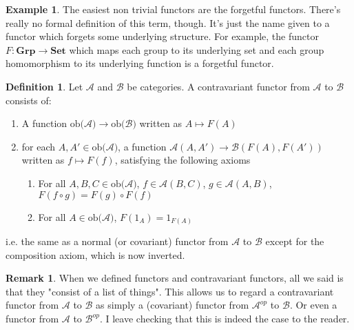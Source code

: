 \documentclass{article}
\theoremstyle{definition}
\newtheorem{definition}[theorem]{Definition}
\newtheorem{remark}[theorem]{Remark}
\newtheorem{example}[theorem]{Example}
\newcommand{\cat}[1]{\mathscr{#1}}
\newcommand{\catobj}[1]{\text{ob(}\cat{#1}\text{)}}
\newcommand{\catmor}[3]{\cat{#1}(#2, #3)}
\begin{document}
\begin{example}
    The easiest non trivial functors are the forgetful functors. There's really no formal definition of this term, though. It's just the name given to a functor which forgets some underlying structure. For example, the functor $F : \textbf{Grp} \to \textbf{Set}$ which maps each group to its underlying set and each group homomorphism to its underlying function is a forgetful functor.
\end{example}

\begin{definition}
    Let $\cat{A}$ and $\cat{B}$ be categories. A contravariant functor from $\cat{A}$ to $\cat{B}$ consists of:
    \begin{enumerate}
        \item A function $\catobj{A} \to \catobj{B}$ written as $A \mapsto F(A)$
        \item for each $A, A' \in \catobj{A}$, a function $\catmor{A}{A}{A'} \to \catmor{B}{F(A)}{F(A')}$ written as $f \mapsto F(f)$, satisfying the following axioms
              \begin{enumerate}
                  \item For all $A, B, C \in \catobj{A}$, $f \in \catmor{A}{B}{C}$, $g \in \catmor{A}{A}{B}$, $F(f \circ g) = F(g) \circ F(f)$
                  \item For all $A \in \catobj{A}$, $F(1_A)=1_{F(A)}$
              \end{enumerate}
    \end{enumerate}
    i.e. the same as a normal (or covariant) functor from $\cat{A}$ to $\cat{B}$ except for the composition axiom, which is now inverted.
\end{definition}

\begin{remark}
    When we defined functors and contravariant functors, all we said is that they "consist of a list of things". This allows us to regard a contravariant functor from $\cat{A}$ to $\cat{B}$ as simply a (covariant) functor from $\cat{A}^{op}$ to $\cat{B}$. Or even a functor from $\cat{A}$ to $\cat{B}^{op}$. I leave checking that this is indeed the case to the reader.
\end{remark}
\end{document}
